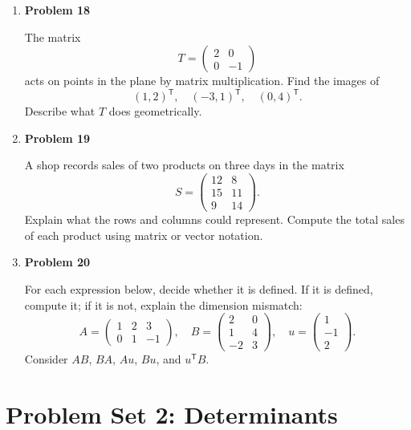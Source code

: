 \begin{enumerate}
\item \textbf{Problem 18}\par
The matrix
\[
T=\begin{pmatrix}2&0\\0&-1\end{pmatrix}
\]
acts on points in the plane by matrix multiplication. Find the images of
\[
(1,2)^{\mathsf T},\quad (-3,1)^{\mathsf T},\quad (0,4)^{\mathsf T}.
\]
Describe what \(T\) does geometrically.

\item \textbf{Problem 19}\par
A shop records sales of two products on three days in the matrix
\[
S=\begin{pmatrix}
12&8\\
15&11\\
9&14
\end{pmatrix}.
\]
Explain what the rows and columns could represent. Compute the total sales of each product using matrix or vector notation.

\item \textbf{Problem 20}\par
For each expression below, decide whether it is defined. If it is defined, compute it; if it is not, explain the dimension mismatch:
\[
A=\begin{pmatrix}1&2&3\\0&1&-1\end{pmatrix},
\quad
B=\begin{pmatrix}2&0\\1&4\\-2&3\end{pmatrix},
\quad
u=\begin{pmatrix}1\\-1\\2\end{pmatrix}.
\]
Consider \(AB\), \(BA\), \(Au\), \(Bu\), and \(u^{\mathsf T}B\).
\end{enumerate}

\section{Problem Set 2: Determinants}

